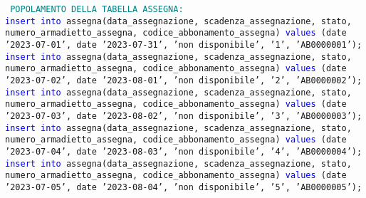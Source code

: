 \documentclass{article}
\begin{document}
    \newpage
    \begin{flushleft}
        \texttt{
        \textcolor{teal}{POPOLAMENTO DELLA TABELLA ASSEGNA:} \\
        \hspace*{0.5em}\textcolor{blue}{insert into} assegna(data\_assegnazione, scadenza\_assegnazione, stato, \hspace*{0.5em}numero\_armadietto\_assegna, codice\_abbonamento\_assegna) \textcolor{blue}{values} \hspace*{0.5em}(date \hspace*{0.5em}'2023-07-01', date '2023-07-31', 'non disponibile', '1', 'AB0000001'); \\
        \vspace{2mm}
        \hspace*{0.5em}\textcolor{blue}{insert into} assegna(data\_assegnazione, scadenza\_assegnazione, stato, \hspace*{0.5em}numero\_armadietto\_assegna, codice\_abbonamento\_assegna) \textcolor{blue}{values} \hspace*{0.5em}(date \hspace*{0.5em}'2023-07-02', date '2023-08-01', 'non disponibile', '2', 'AB0000002'); \\
        \vspace{2mm}
        \hspace*{0.5em}\textcolor{blue}{insert into} assegna(data\_assegnazione, scadenza\_assegnazione, stato, \hspace*{0.5em}numero\_armadietto\_assegna, codice\_abbonamento\_assegna) \textcolor{blue}{values} \hspace*{0.5em}(date \hspace*{0.5em}'2023-07-03', date '2023-08-02', 'non disponibile', '3', 'AB0000003'); \\
        \vspace{2mm}
        \hspace*{0.5em}\textcolor{blue}{insert into} assegna(data\_assegnazione, scadenza\_assegnazione, stato, \hspace*{0.5em}numero\_armadietto\_assegna, codice\_abbonamento\_assegna) \textcolor{blue}{values} \hspace*{0.5em}(date \hspace*{0.5em}'2023-07-04', date '2023-08-03', 'non disponibile', '4', 'AB0000004'); \\
        \vspace{2mm}
        \hspace*{0.5em}\textcolor{blue}{insert into} assegna(data\_assegnazione, scadenza\_assegnazione, stato, \hspace*{0.5em}numero\_armadietto\_assegna, codice\_abbonamento\_assegna) \textcolor{blue}{values} \hspace*{0.5em}(date \hspace*{0.5em}'2023-07-05', date '2023-08-04', 'non disponibile', '5', 'AB0000005'); \\
}
\end{flushleft}
\end{document}
